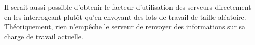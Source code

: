 Il serait aussi possible d'obtenir le facteur d'utilisation des serveurs directement en les interrogeant plutôt qu'en envoyant des lots de travail de taille 
aléatoire. Théoriquement, rien n'empêche le serveur de renvoyer des informations sur sa charge de travail actuelle.






%
%
%
%
%
%
